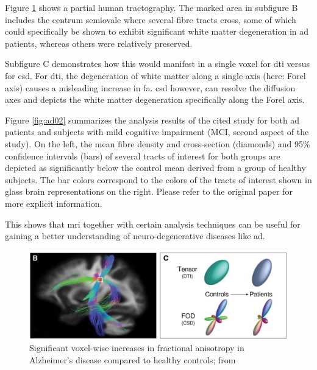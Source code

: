 \documentclass[plainreport]{cgvpub}
\begin{document}
	Figure \ref{fig:ad01} shows a partial human tractography. The marked area in subfigure B includes the centrum semiovale where several fibre tracts cross, some of which could specifically be shown to exhibit significant white matter degeneration in \acrshort{ad} patients, whereas others were relatively preserved. 
	
	Subfigure C demonstrates how this would manifest in a single voxel for \acrshort{dti} versus for \acrshort{csd}. For \acrshort{dti}, the degeneration of white matter along a single axis (here: Forel axis) causes a misleading increase in \acrshort{fa}. \acrshort{csd} however, can resolve the diffusion axes and depicts the white matter degeneration specifically along the Forel axis.
	
	Figure \ref{fig:ad02} summarizes the analysis results of the cited study for both \acrshort{ad} patients and subjects with mild cognitive impairment (MCI, second aspect of the study). On the left, the mean fibre density and cross-section (diamonds) and 95\% confidence intervals (bars) of several tracts of interest for both groups are depicted as significantly below the control mean derived from a group of healthy subjects. The bar colors correspond to the colors of the tracts of interest shown in glass brain representations on the right. Please refer to the original paper for more explicit information.
	
	This shows that \acrshort{mri} together with certain analysis techniques can be useful for gaining a better understanding of neuro-degenerative diseases like \acrshort{ad}.
	
	\begin{figure}
		\includegraphics[width=\linewidth]{../pics/ad01_crop}
		\caption[Significant voxel-wise increases in fractional anisotropy in Alzheimer's disease compared to healthy controls]{Significant voxel-wise increases in fractional anisotropy in Alzheimer's disease compared to healthy controls; from \cite{ad}}
		\label{fig:ad01}
	\end{figure}
\end{document}
